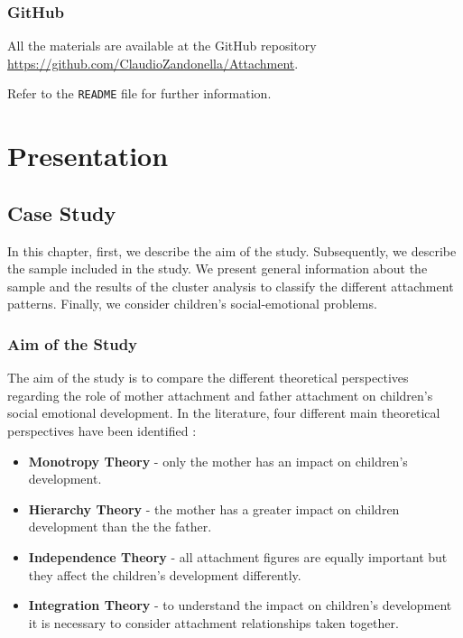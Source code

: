 \documentclass[
]{book}
\providecommand{\tightlist}{%
  \setlength{\itemsep}{0pt}\setlength{\parskip}{0pt}}
\begin{document}
\hypertarget{github}{%
\section*{GitHub}\label{github}}

All the materials are available at the GitHub repository \url{https://github.com/ClaudioZandonella/Attachment}.

Refer to the \texttt{README} file for further information.

\hypertarget{part-presentation}{%
\part*{Presentation}\label{part-presentation}}

\hypertarget{case-study}{%
\chapter{Case Study}\label{case-study}}

In this chapter, first, we describe the aim of the study. Subsequently, we describe the sample included in the study. We present general information about the sample and the results of the cluster analysis to classify the different attachment patterns. Finally, we consider children's social-emotional problems.

\hypertarget{aim-of-the-study}{%
\section{Aim of the Study}\label{aim-of-the-study}}

The aim of the study is to compare the different theoretical perspectives regarding the role of mother attachment and father attachment on children's social emotional development. In the literature, four different main theoretical perspectives have been identified \citep{brethertonFathersAttachmentTheory2010}:

\begin{itemize}
\tightlist
\item
  \textbf{Monotropy Theory} - only the mother has an impact on children's development.
\item
  \textbf{Hierarchy Theory} - the mother has a greater impact on children development than the the father.
\item
  \textbf{Independence Theory} - all attachment figures are equally important but they affect the children's development differently.
\item
  \textbf{Integration Theory} - to understand the impact on children's development it is necessary to consider attachment relationships taken together.
\end{itemize}
\end{document}
